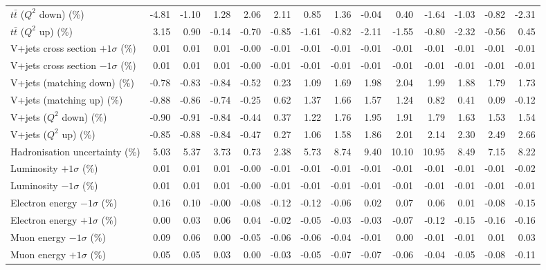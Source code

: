 \begin{table}[htbp]
{\begin{tabular}{lrrrrrrrrrrrrr}
$t\bar{t}$ ($Q^{2}$ down) (\%) & -4.81 & -1.10 & 1.28 & 2.06 & 2.11 & 0.85 & 1.36 & -0.04 & 0.40 & -1.64 & -1.03 & -0.82 & -2.31 \\ 
$t\bar{t}$ ($Q^{2}$ up) (\%) & 3.15 & 0.90 & -0.14 & -0.70 & -0.85 & -1.61 & -0.82 & -2.11 & -1.55 & -0.80 & -2.32 & -0.56 & 0.45 \\ 
V+jets cross section \ensuremath{+1\sigma} (\%) & 0.01 & 0.01 & 0.01 & -0.00 & -0.01 & -0.01 & -0.01 & -0.01 & -0.01 & -0.01 & -0.01 & -0.01 & -0.01 \\ 
V+jets cross section \ensuremath{-1\sigma} (\%) & 0.01 & 0.01 & 0.01 & -0.00 & -0.01 & -0.01 & -0.01 & -0.01 & -0.01 & -0.01 & -0.01 & -0.01 & -0.01 \\ 
V+jets (matching down) (\%) & -0.78 & -0.83 & -0.84 & -0.52 & 0.23 & 1.09 & 1.69 & 1.98 & 2.04 & 1.99 & 1.88 & 1.79 & 1.73 \\ 
V+jets (matching up) (\%) & -0.88 & -0.86 & -0.74 & -0.25 & 0.62 & 1.37 & 1.66 & 1.57 & 1.24 & 0.82 & 0.41 & 0.09 & -0.12 \\ 
V+jets ($Q^{2}$ down) (\%) & -0.90 & -0.91 & -0.84 & -0.44 & 0.37 & 1.22 & 1.76 & 1.95 & 1.91 & 1.79 & 1.63 & 1.53 & 1.54 \\ 
V+jets ($Q^{2}$ up) (\%) & -0.85 & -0.88 & -0.84 & -0.47 & 0.27 & 1.06 & 1.58 & 1.86 & 2.01 & 2.14 & 2.30 & 2.49 & 2.66 \\ 
Hadronisation uncertainty (\%) & 5.03 & 5.37 & 3.73 & 0.73 & 2.38 & 5.73 & 8.74 & 9.40 & 10.10 & 10.95 & 8.49 & 7.15 & 8.22 \\ 
Luminosity $+1\sigma$ (\%) & 0.01 & 0.01 & 0.01 & -0.00 & -0.01 & -0.01 & -0.01 & -0.01 & -0.01 & -0.01 & -0.01 & -0.01 & -0.02 \\ 
Luminosity $-1\sigma$ (\%) & 0.01 & 0.01 & 0.01 & -0.00 & -0.01 & -0.01 & -0.01 & -0.01 & -0.01 & -0.01 & -0.01 & -0.01 & -0.01 \\ 
Electron energy $-1\sigma$ (\%) & 0.16 & 0.10 & -0.00 & -0.08 & -0.12 & -0.12 & -0.06 & 0.02 & 0.07 & 0.06 & 0.01 & -0.08 & -0.15 \\ 
Electron energy $+1\sigma$ (\%) & 0.00 & 0.03 & 0.06 & 0.04 & -0.02 & -0.05 & -0.03 & -0.03 & -0.07 & -0.12 & -0.15 & -0.16 & -0.16 \\ 
Muon energy $-1\sigma$ (\%) & 0.09 & 0.06 & 0.00 & -0.05 & -0.06 & -0.06 & -0.04 & -0.01 & 0.00 & -0.01 & -0.01 & 0.01 & 0.03 \\ 
Muon energy $+1\sigma$ (\%) & 0.05 & 0.05 & 0.03 & 0.00 & -0.03 & -0.05 & -0.07 & -0.07 & -0.06 & -0.04 & -0.05 & -0.08 & -0.11 \\ 

\end{tabular}}
\end{table}
